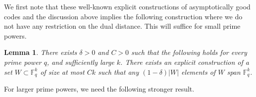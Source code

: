 \documentclass[11pt]{article}
\theoremstyle{plain}
\newtheorem{lemma}[theorem]{Lemma}
\theoremstyle{definition}
\begin{document}
We first note that these well-known explicit constructions of asymptotically good codes \cite{alon1992construction, justesen1972class, tsfasman2013algebraic, tsfasman1982modular} and the discussion above implies the following construction where we do not have any restriction on the dual distance. 
This will suffice for small prime powers. 

\begin{lemma}\label{lemma:constr2}
There exists $\delta>0$ and $C>0$ such that the following holds for every prime power $q$, and sufficiently large $k$. There exists an explicit construction of a set $W\subset \mathbb{F}_q^k$ of size at most $Ck$ such that any $(1-\delta)|W|$ elements of $W$ span $\mathbb{F}_q^k$.
\end{lemma}

For larger prime powers, we need the following stronger result. 
\end{document}
